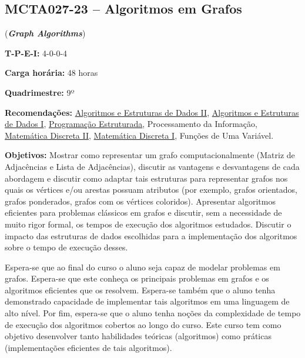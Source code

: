 \documentclass[class=article, crop=false]{standalone}
\begin{document}
\subsection*{MCTA027-23 -- Algoritmos em Grafos}
\label{disc:ag}

(\textbf{\textit{Graph Algorithms}})

\begin{center}
    \begin{minipage}{0.85\textwidth}
        \textbf{T-P-E-I:} 4-0-0-4
        
        \textbf{Carga horária:} 48 horas
        
        \textbf{Quadrimestre:} 9º
        
        \textbf{Recomendações:} 
        \hyperref[disc:aedII]{Algoritmos e Estruturas de Dados II},
        \hyperref[disc:aedI]{Algoritmos e Estruturas de Dados I},
        \hyperref[disc:pe]{Programação Estruturada},
        Processamento da Informação,
        \hyperref[disc:mdII]{Matemática Discreta II},
        \hyperref[disc:mdI]{Matemática Discreta I},
        Funções de Uma Variável.
    \end{minipage}
\end{center}

\textbf{Objetivos:}
Mostrar como representar um grafo computacionalmente (Matriz de Adjacências e
Lista de Adjacências), discutir as vantagens e desvantagens de cada abordagem e
discutir como adaptar tais estruturas para representar grafos nos quais os
vértices e/ou arestas possuam atributos (por exemplo, grafos orientados, grafos
ponderados, grafos com os vértices coloridos).
Apresentar algoritmos eficientes para problemas clássicos em grafos e discutir,
sem a necessidade de muito rigor formal, os tempos de execução dos algoritmos
estudados. 
Discutir o impacto das estruturas de dados escolhidas para a implementação dos
algoritmos sobre o tempo de execução desses.

Espera-se que ao final do curso o aluno seja capaz de modelar problemas em
grafos. Espera-se que este conheça os principais problemas em grafos e os
algoritmos eficientes que os resolvem. Espera-se também que o aluno tenha
demonstrado capacidade de implementar tais algoritmos em uma linguagem de alto
nível. Por fim, espera-se que o aluno tenha noções da complexidade de tempo de
execução dos algoritmos cobertos ao longo do curso. Este curso tem como
objetivo desenvolver tanto habilidades teóricas (algoritmos) como práticas
(implementações eficientes de tais algoritmos).
\end{document}

